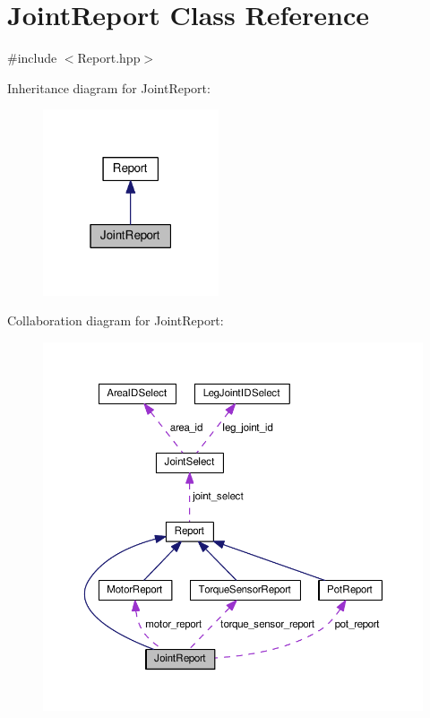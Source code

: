 \hypertarget{classJointReport}{}\section{Joint\+Report Class Reference}
\label{classJointReport}


{\ttfamily \#include $<$Report.\+hpp$>$}



Inheritance diagram for Joint\+Report\+:\nopagebreak
\begin{figure}[H]
\begin{center}
\leavevmode
\includegraphics[width=147pt]{classJointReport__inherit__graph}
\end{center}
\end{figure}


Collaboration diagram for Joint\+Report\+:\nopagebreak
\begin{figure}[H]
\begin{center}
\leavevmode
\includegraphics[width=350pt]{classJointReport__coll__graph}
\end{center}
\end{figure}

